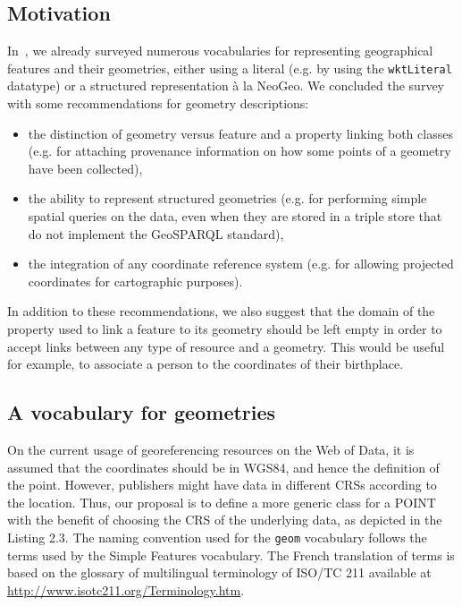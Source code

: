 \subsection{Motivation}
\label{sec:bpgeo}

In~\cite{Atemezing:TC12}, we already surveyed numerous vocabularies for representing geographical features and their geometries, either using a literal (e.g. by using the \texttt{wktLiteral} datatype) or a structured representation \`a la NeoGeo. We concluded the survey with some recommendations for geometry descriptions:
\begin{itemize}
 \item the distinction of geometry versus feature and a property linking both classes (e.g. for attaching provenance information on how some points of a geometry have been collected),
 \item the ability to represent structured geometries (e.g. for performing simple spatial queries on the data, even when they are stored in a triple store that do not implement the GeoSPARQL standard),
 \item the integration of any coordinate reference system  (e.g. for allowing projected coordinates for cartographic purposes).
\end{itemize}
In addition to these recommendations, we also suggest that the domain of the property used to link a feature to its geometry should be left empty in order to accept links between any type of resource and a geometry. This would be useful for example, to associate a person to the coordinates of their birthplace.

\subsection{A vocabulary for geometries} \label{sec:geomvocab}

On the current usage of georeferencing resources on the Web of Data, it is assumed that the coordinates should be in WGS84, and hence the definition of the point. However, publishers might have data in different CRSs according to the location. Thus, our proposal is to define a more generic class for a POINT  with the benefit of choosing the CRS of the underlying data, as depicted in the Listing 2.3. 
The naming convention used for the \texttt{geom} vocabulary follows the terms used by the Simple Features vocabulary. The French translation of terms is based on the glossary of multilingual terminology of ISO/TC 211 available at \url{http://www.isotc211.org/Terminology.htm}.

